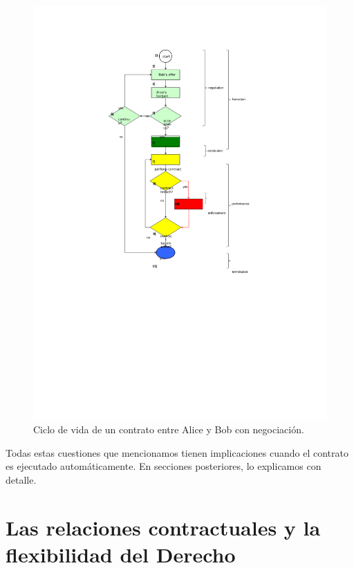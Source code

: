 \documentclass[12pt]{report} %
\begin{document}
\begin{figure}
\centering
  \includegraphics[height=0.90\textheight] {ciclodevidadecontrdercontconneg.pdf}
\caption{Ciclo de vida de un contrato entre Alice y Bob con negociación.} 
\label{fig:lifecyclecivilcontnobargain1}
\end{figure}

Todas estas cuestiones que mencionamos tienen implicaciones cuando el contrato es ejecutado automáticamente. En secciones posteriores, lo explicamos con detalle.

\section{Las relaciones contractuales y la flexibilidad del Derecho}
\label{flexibilidadderecho}
\end{document}
